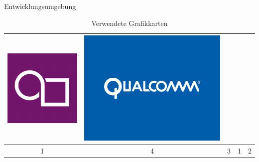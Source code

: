 \begin{frame}{Entwicklungsumgebung}
\begin{table}[h]
\begin{tabular}{c|c|c|c|c}
		\includegraphics[width=\textwidth, height=0.1\textheight, keepaspectratio]{images/powerVR-logo} &
		\includegraphics[width=\textwidth, height=0.1\textheight, keepaspectratio]{images/qualcomm-logo} \\ \hline
		1 & 4 & 3 & 1 & 2
	\end{tabular}
	\caption{Verwendete Grafikkarten}
\end{table}
\end{frame}

